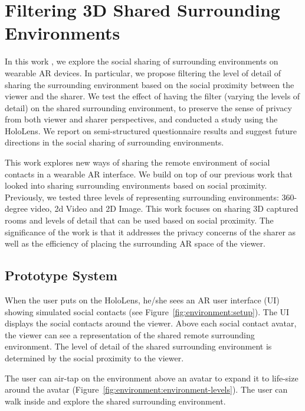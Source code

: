 \section{Filtering 3D Shared Surrounding Environments}
\label{sec:surrounding:environment}

In this work \cite{Nassani2018b}, we explore the social sharing of surrounding environments on wearable AR devices. In particular, we propose filtering the level of detail of sharing the surrounding environment based on the social proximity between the viewer and the sharer. We test the effect of having the filter (varying the levels of detail) on the shared surrounding environment, to preserve the sense of privacy from both viewer and sharer perspectives, and conducted a study using the HoloLens. We report on semi-structured questionnaire results and suggest future directions in the social sharing of surrounding environments.

This work explores new ways of sharing the remote environment of social contacts in a wearable AR interface. We build on top of our previous work \cite{Nassani2018a} that looked into sharing surrounding environments based on social proximity. Previously, we tested three levels of representing surrounding environments: 360-degree video, 2d Video and 2D Image. This work focuses on sharing 3D captured rooms and levels of detail that can be used based on social proximity. The significance of the work is that it addresses the privacy concerns of the sharer as well as the efficiency of placing the surrounding AR space of the viewer.

\subsection{Prototype System}

When the user puts on the HoloLens, he/she sees an AR user interface (UI) showing simulated social contacts (see Figure~\ref{fig:environment:setup}). The UI displays the social contacts around the viewer. Above each social contact avatar, the viewer can see a representation of the shared remote surrounding environment. The level of detail of the shared surrounding environment is determined by the social proximity to the viewer.

The user can air-tap on the environment above an avatar to expand it to life-size around the avatar (Figure~\ref{fig:environment:environment-levels}). The user can walk inside and explore the shared surrounding environment.

